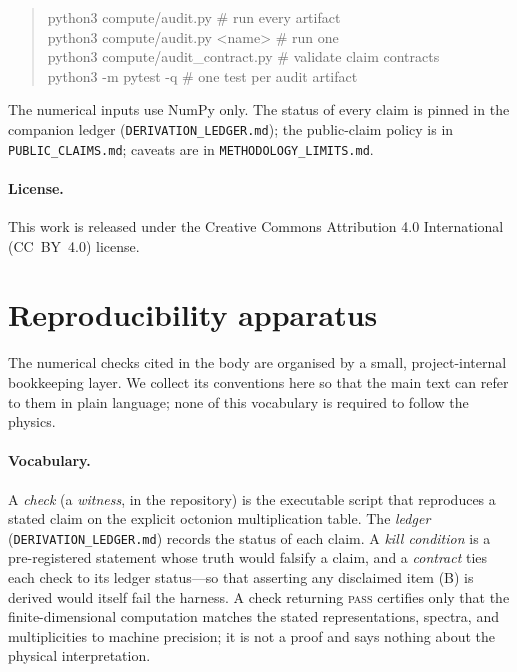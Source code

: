 \documentclass[11pt,a4paper]{article}
\theoremstyle{plain}
\newcommand{\code}[1]{\texttt{#1}}
\begin{document}
\begin{quote}\ttfamily\small
python3 compute/audit.py \quad\textrm{\# run every artifact}\\
python3 compute/audit.py <name> \quad\textrm{\# run one}\\
python3 compute/audit\_contract.py \quad\textrm{\# validate claim contracts}\\
python3 -m pytest -q \quad\textrm{\# one test per audit artifact}
\end{quote}

The numerical inputs use NumPy only. The status of every claim is pinned in the
companion ledger (\code{DERIVATION\_LEDGER.md}); the public-claim policy is in
\code{PUBLIC\_CLAIMS.md}; caveats are in \code{METHODOLOGY\_LIMITS.md}.

\paragraph{License.}
This work is released under the Creative Commons Attribution 4.0 International
(CC~BY~4.0) license.

\appendix

\section{Reproducibility apparatus}
\label{app:repro}

The numerical checks cited in the body are organised by a small, project-internal
bookkeeping layer. We collect its conventions here so that the main text can refer
to them in plain language; none of this vocabulary is required to follow the
physics.

\paragraph{Vocabulary.}
A \emph{check} (a \emph{witness}, in the repository) is the executable script that
reproduces a stated claim on the explicit octonion multiplication table. The
\emph{ledger} (\code{DERIVATION\_LEDGER.md}) records the status of each claim. A
\emph{kill condition} is a pre-registered statement whose truth would falsify a
claim, and a \emph{contract} ties each check to its ledger status---so that
asserting any disclaimed item (B) is derived would itself fail the harness. A
check returning \textsc{pass} certifies only that the finite-dimensional
computation matches the stated representations, spectra, and multiplicities to
machine precision; it is not a proof and says nothing about the physical
interpretation.
\end{document}

